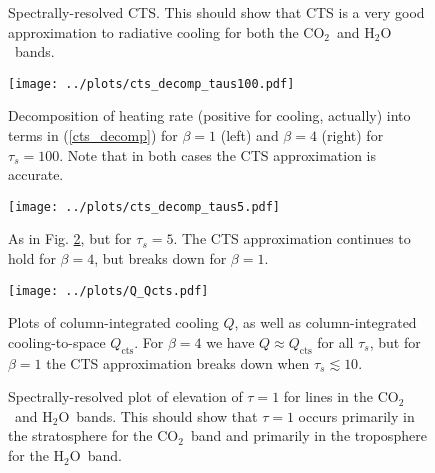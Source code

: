 \documentclass[10pt]{article}
\newcommand{\eqnref}[1]{(\ref{#1})}
\newcommand{\cotwo}{\ensuremath{\mathrm{CO_2}}}
\newcommand{\htwo}{\ensuremath{\mathrm{H_2O}}}
\newcommand{\Qcts}{\ensuremath{Q_\mathrm{cts}}}
\newcommand{\taus}{\ensuremath{\tau_s}}
\begin{document}
\begin{figure}[h!]
	\begin{center}
		\caption{Spectrally-resolved CTS. This should show that CTS is a very good approximation to radiative cooling for both the \cotwo\ and \htwo\ bands. 
		\label{lbl_cts}
		}
	\end{center}
\end{figure}

\begin{figure}[h!]
	\begin{center}
			\texttt{[image: ../plots/cts\_decomp\_taus100.pdf]}
		\caption{Decomposition of heating rate (positive for cooling, actually) into terms in \eqnref{cts_decomp} for $\beta=1$ (left) and $\beta=4$ (right) for $\taus=100$. Note that in both cases the CTS approximation is accurate.
		\label{cts_decomp_taus100}
		}
	\end{center}
\end{figure}

\begin{figure}[h!]
	\begin{center}
			\texttt{[image: ../plots/cts\_decomp\_taus5.pdf]}
		\caption{As in Fig. \ref{cts_decomp_taus100}, but for $\taus=5$. The CTS approximation continues to hold for $\beta=4$, but breaks down for $\beta=1$.
		\label{cts_decomp_taus5}
		}
	\end{center}
\end{figure}


\begin{figure}[h!]
	\begin{center}
			\texttt{[image: ../plots/Q\_Qcts.pdf]}
		\caption{Plots of column-integrated cooling $Q$, as well as column-integrated cooling-to-space \Qcts. For $\beta=4$ we have $Q\approx \Qcts$ for all \taus, but for $\beta=1$ the CTS approximation breaks down when $\taus \lesssim 10$. 
		\label{Q_Qcts}
		}
	\end{center}
\end{figure}

\begin{figure}[h!]
	\begin{center}
		\caption{Spectrally-resolved plot of elevation of $\tau=1$ for lines in the \cotwo\ and \htwo\ bands. This should show that $\tau=1$ occurs primarily in the stratosphere for the \cotwo\ band and primarily in the troposphere for the \htwo\ band.
		\label{tau=1_lbl}
		}
	\end{center}
\end{figure}
\end{document}
